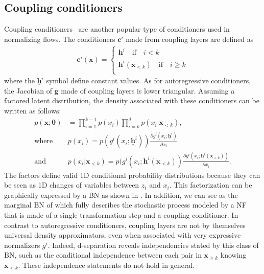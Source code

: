 \subsection{Coupling conditioners}
Coupling conditioners~\cite{dinh_density_2017} are another popular type of conditioners used in normalizing flows. The conditioners $\mathbf{c}^i$ made from coupling layers are defined as
\begin{align*}
    \mathbf{c}^i(\mathbf{x}) =
    \begin{cases}
    \underline{\mathbf{h}}^i \quad \text{if} \quad i < k\\
    \mathbf{h}^i(\mathbf{x}_{<k}) \quad \text{if} \quad i \geq k\\
    \end{cases}
\end{align*}
where the $\underline{\mathbf{h}}^i$ symbol define constant values. As for autoregressive conditioners, the Jacobian of $\mathbf{g}$ made of coupling layers is lower triangular. Assuming a factored latent distribution, the density associated with these conditioners can be written as follows:
\begin{align*}
    p(\mathbf{x}; \mathbf{\theta}) &= \prod^{k-1}_{i=1} p(x_i)\prod^{d}_{i=k} p(x_i|\mathbf{x}_{< k}),\\
    \text{where} \quad & p(x_i) = p(g^i(x_i; \underline{\mathbf{h}}^i))\frac{\partial g^i(x_i; \underline{\mathbf{h}}^i)}{\partial x_i} \\ \text{and} \quad & p(x_i|\mathbf{x}_{< k}) = p(g^i(x_i; \mathbf{h}^i(\mathbf{x}_{<k})) \frac{\partial g^i(x_i; \mathbf{h}^i(\mathbf{x}_{<k}))}{\partial x_i}.
\end{align*}
The factors define valid 1D conditional probability distributions because they can be seen as 1D changes of variables between $z_i$ and $x_i$. This factorization can be graphically expressed by a BN as shown in . In addition, we can see  as the marginal BN of  which fully describes the stochastic process modeled by a NF that is made of a single transformation step and a coupling conditioner.
In contrast to autoregressive conditioners, coupling layers are not by themselves universal density approximators, even when associated with very expressive normalizers $g^i$.
Indeed, d-separation reveals independencies stated by this class of BN, such as the conditional independence between each pair in $\mathbf{x}_{\geq k}$ knowing $\mathbf{x}_{< k}$. These independence statements do not hold in general.


